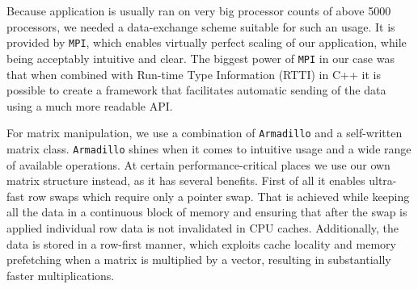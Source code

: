 \documentclass[11pt,a4paper]{article}
\begin{document}
\begin{appendices}
    Because application is usually ran on very big processor counts of above 5000 processors, we needed a data-exchange scheme suitable for such an usage.
    It is provided by \texttt{MPI}\cite{richard06}, which enables virtually perfect scaling of our application, while being acceptably intuitive and clear.
    The biggest power of \texttt{MPI} in our case was that when combined with Run-time Type Information (RTTI) in C++ it is possible to create a framework that facilitates automatic sending of the data using a much more readable API.

    For matrix manipulation, we use a combination of \texttt{Armadillo}\cite{Sanderson10} and a self-written matrix class.
    \texttt{Armadillo} shines when it comes to intuitive usage and a wide range of available operations.
    At certain performance-critical places we use our own matrix structure instead, as it has several benefits.
    First of all it enables ultra-fast row swaps which require only a pointer swap.
    That is achieved while keeping all the data in a continuous block of memory and ensuring that after the swap is applied individual row data is not invalidated in CPU caches.
    Additionally, the data is stored in a row-first manner, which exploits cache locality and memory prefetching when a matrix is multiplied by a vector, resulting in substantially faster multiplications.


\end{appendices}
\end{document}
